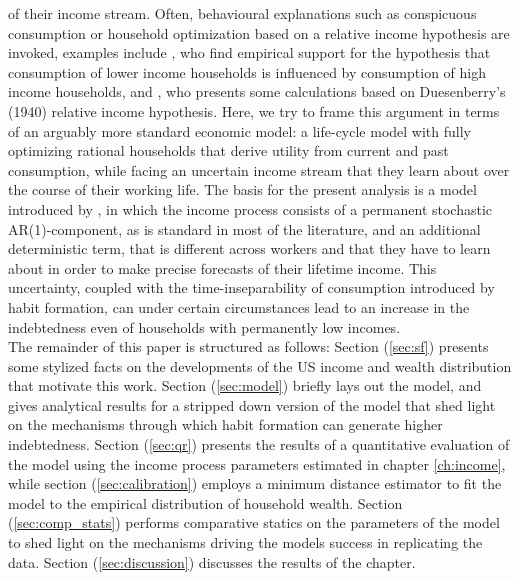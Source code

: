  of their income stream. Often, behavioural explanations such as conspicuous 
consumption or household optimization based on a relative income hypothesis are 
invoked, examples include \citet{BertrandMorse2012}, who find empirical support 
for the hypothesis that consumption of lower income households is influenced by 
consumption of high income households, and \citet{vanTreeck2012}, who presents 
some calculations based on Duesenberry's (1940) relative income hypothesis. 
Here, we try to frame this argument in terms of an arguably more standard 
economic model: a life-cycle model with fully optimizing rational households 
that derive utility from current and past consumption, while facing an uncertain
 income stream that they learn about over the course of their working life. The 
basis for the present analysis is a model introduced by \citet{Guvenen2007}, in 
which the income process consists of a permanent stochastic AR(1)-component, as 
is standard in most of the literature, and an additional deterministic term,
 that is different across workers and that they have to learn about in order to
make precise forecasts of their lifetime income. This uncertainty, coupled with 
the time-inseparability of consumption introduced by habit formation, can under 
certain circumstances lead to an increase in the indebtedness even of households
 with permanently low incomes. \\
The remainder of this paper is structured as follows: Section (\ref{sec:sf}) 
presents some stylized facts on the developments of the US income and wealth 
distribution that motivate this work. Section (\ref{sec:model}) briefly lays
out the model, 
 and gives analytical results for a stripped down version of the model that 
shed light on the mechanisms through which habit formation can generate higher 
indebtedness. Section (\ref{sec:qr}) presents the results of a quantitative 
evaluation of the model using the income process parameters estimated in 
chapter \ref{ch:income}, while section (\ref{sec:calibration}) employs a 
minimum distance estimator to fit the model to the empirical distribution of 
household wealth. Section (\ref{sec:comp_stats}) performs comparative statics
on the parameters of the model to shed light on the mechanisms driving the models
success in replicating the data. Section (\ref{sec:discussion}) discusses the 
results of the chapter.

\pagebreak
